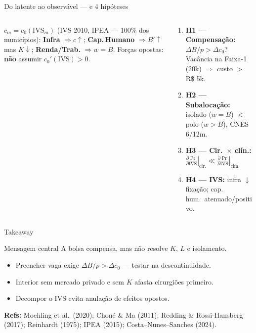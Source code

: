 \documentclass[10pt,aspectratio=169]{beamer}
\begin{document}
\begin{frame}{Do latente ao observável — e 4 hipóteses}
\begin{columns}[T]
\begin{column}{0.42\textwidth}
{\small
$c_m = c_0(\text{IVS}_m)$ (IVS 2010, IPEA — 100\% dos municípios):
\textbf{Infra} $\Rightarrow c \uparrow$; \textbf{Cap.\,Humano} $\Rightarrow B' \uparrow$ mas $K \downarrow$; \textbf{Renda/Trab.} $\Rightarrow w = B$. Forças opostas: \textbf{não} assumir $c_0'(\text{IVS}) > 0$.
}
\end{column}
\begin{column}{0.58\textwidth}
{\small
\begin{enumerate}
  \itemsep0pt
  \item \textbf{H1 — Compensação:} $\Delta B/p > \Delta c_0$? Vacância na Faixa-1 (20k) $\Rightarrow$ custo $> $ R\$ 5k.
  \item \textbf{H2 — Subalocação:} isolado ($w = B$) $<$ polo ($w > B$), CNES 6/12m.
  \item \textbf{H3 — Cir.\ $\times$ clín.:} $\left.\frac{\partial \Pr}{\partial \text{IVS}}\right|_{\text{cir.}} \ll \left.\frac{\partial \Pr}{\partial \text{IVS}}\right|_{\text{clín.}}$
  \item \textbf{H4 — IVS:} infra $\downarrow$ fixação; cap.\,hum.\ atenuado/positivo.
\end{enumerate}
}
\end{column}
\end{columns}
\end{frame}

\begin{frame}{Takeaway}
\begin{block}{Mensagem central}
A bolsa compensa, mas não resolve $K$, $L$ e isolamento.
\end{block}
\begin{itemize}
  \item Preencher vaga exige $\Delta B / p > \Delta c_0$ — testar na descontinuidade.
  \item Interior sem mercado privado e sem $K$ afasta cirurgiões primeiro.
  \item Decompor o IVS evita anulação de efeitos opostos.
\end{itemize}
\vspace{0.5em}
{\footnotesize
\textbf{Refs:} Moehling et al.\ (2020); Choné \& Ma (2011); Redding \& Rossi-Hansberg (2017); Reinhardt (1975); IPEA (2015); Costa--Nunes--Sanches (2024).
}
\end{frame}
\end{document}
